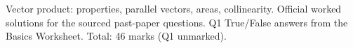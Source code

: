 \def\housemode{sol}
\def\diquestionsonly{1}

\def\risoltitle{H2 Math Vectors I Homework 3: Solutions}

\risolfront
{\small\textcolor{black!60}{Vector product: properties, parallel vectors, areas, collinearity. Official worked solutions for the sourced past-paper questions. Q1 True/False answers from the Basics Worksheet. Total: 46 marks (Q1 unmarked).}}\par\medskip
{}%
\diend

